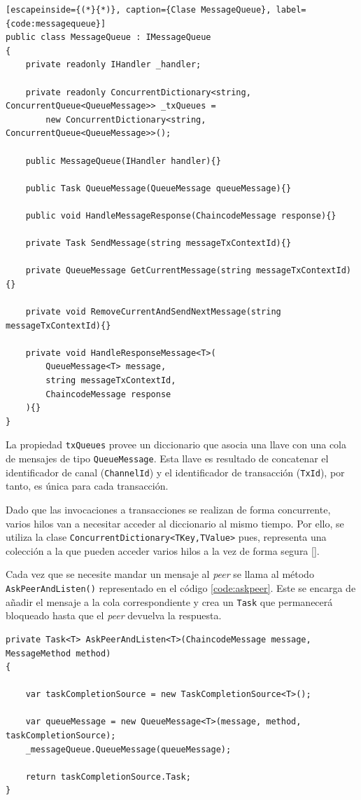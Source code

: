 \begin{lstlisting}[escapeinside={(*}{*)}, caption={Clase MessageQueue}, label={code:messagequeue}]
public class MessageQueue : IMessageQueue
{
    private readonly IHandler _handler;

    private readonly ConcurrentDictionary<string, ConcurrentQueue<QueueMessage>> _txQueues =
        new ConcurrentDictionary<string, ConcurrentQueue<QueueMessage>>();

    public MessageQueue(IHandler handler){}

    public Task QueueMessage(QueueMessage queueMessage){}

    public void HandleMessageResponse(ChaincodeMessage response){}

    private Task SendMessage(string messageTxContextId){}

    private QueueMessage GetCurrentMessage(string messageTxContextId){}

    private void RemoveCurrentAndSendNextMessage(string messageTxContextId){}

    private void HandleResponseMessage<T>(
        QueueMessage<T> message,
        string messageTxContextId,
        ChaincodeMessage response
    ){}
}
\end{lstlisting}
La propiedad \texttt{txQueues} provee un diccionario que asocia una llave con una cola de mensajes de tipo \texttt{QueueMessage}. Esta llave es resultado de concatenar el identificador de canal (\texttt{ChannelId}) y el identificador de transacción (\texttt{TxId}), por tanto, es única para cada transacción.

Dado que las invocaciones a transacciones se realizan de forma concurrente, varios hilos van a necesitar acceder al diccionario al mismo tiempo. Por ello, se utiliza la clase \texttt{ConcurrentDictionary<TKey,TValue>} pues, representa una colección a la que pueden acceder varios hilos a la vez de forma segura [\cite{microsoftdoc}].

Cada vez que se necesite mandar un mensaje al \textit{peer} se llama al método \texttt{AskPeerAndListen()} representado en el código \ref{code:askpeer}. Este se encarga de añadir el mensaje a la cola correspondiente y crea un \texttt{Task} que permanecerá bloqueado hasta que el \textit{peer} devuelva la respuesta. 

\begin{lstlisting}[caption={Función \texttt{Handler.AspPeerAndListen<T>(...)}}, label={code:askpeer}]
private Task<T> AskPeerAndListen<T>(ChaincodeMessage message, MessageMethod method)
{

	var taskCompletionSource = new TaskCompletionSource<T>();
	
	var queueMessage = new QueueMessage<T>(message, method, taskCompletionSource);
	_messageQueue.QueueMessage(queueMessage);
	
	return taskCompletionSource.Task;
}
\end{lstlisting}


